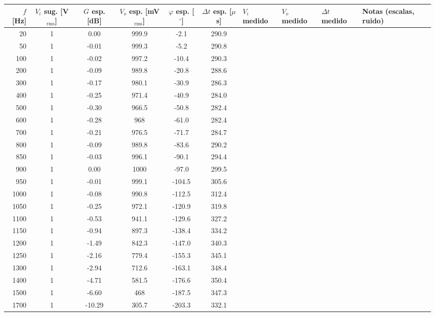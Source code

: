 \documentclass[10pt,a4paper]{article}
\begin{document}
\begin{longtable}{|r|c|c|c|c|c|p{2.4cm}|p{2.4cm}|p{2.4cm}|p{3.6cm}|}
\hline
$f$ [Hz] & $V_i$ sug. [V$_{\mathrm{rms}}$] & $G$ esp. [dB] & $V_o$ esp. [mV$_{\mathrm{rms}}$] & $\varphi$ esp. [$^\circ$] & $\Delta t$ esp. [$\mu$s] &
$V_i$ medido & $V_o$ medido & $\Delta t$ medido & Notas (escalas, ruido) \\ \hline
\endhead
20 & 1 & 0.00 & 999.9 & -2.1 & 290.9 & & & & \\ \hline
50 & 1 & -0.01 & 999.3 & -5.2 & 290.8 & & & & \\ \hline
100 & 1 & -0.02 & 997.2 & -10.4 & 290.3 & & & & \\ \hline
200 & 1 & -0.09 & 989.8 & -20.8 & 288.6 & & & & \\ \hline
300 & 1 & -0.17 & 980.1 & -30.9 & 286.3 & & & & \\ \hline
400 & 1 & -0.25 & 971.4 & -40.9 & 284.0 & & & & \\ \hline
500 & 1 & -0.30 & 966.5 & -50.8 & 282.4 & & & & \\ \hline
600 & 1 & -0.28 & 968 & -61.0 & 282.4 & & & & \\ \hline
700 & 1 & -0.21 & 976.5 & -71.7 & 284.7 & & & & \\ \hline
800 & 1 & -0.09 & 989.8 & -83.6 & 290.2 & & & & \\ \hline
850 & 1 & -0.03 & 996.1 & -90.1 & 294.4 & & & & \\ \hline
900 & 1 & 0.00 & 1000 & -97.0 & 299.5 & & & & \\ \hline
950 & 1 & -0.01 & 999.1 & -104.5 & 305.6 & & & & \\ \hline
1000 & 1 & -0.08 & 990.8 & -112.5 & 312.4 & & & & \\ \hline
1050 & 1 & -0.25 & 972.1 & -120.9 & 319.8 & & & & \\ \hline
1100 & 1 & -0.53 & 941.1 & -129.6 & 327.2 & & & & \\ \hline
1150 & 1 & -0.94 & 897.3 & -138.4 & 334.2 & & & & \\ \hline
1200 & 1 & -1.49 & 842.3 & -147.0 & 340.3 & & & & \\ \hline
1250 & 1 & -2.16 & 779.4 & -155.3 & 345.1 & & & & \\ \hline
1300 & 1 & -2.94 & 712.6 & -163.1 & 348.4 & & & & \\ \hline
1400 & 1 & -4.71 & 581.5 & -176.6 & 350.4 & & & & \\ \hline
1500 & 1 & -6.60 & 468 & -187.5 & 347.3 & & & & \\ \hline
1700 & 1 & -10.29 & 305.7 & -203.3 & 332.1 & & & & \\ \hline

\end{longtable}
\end{document}
